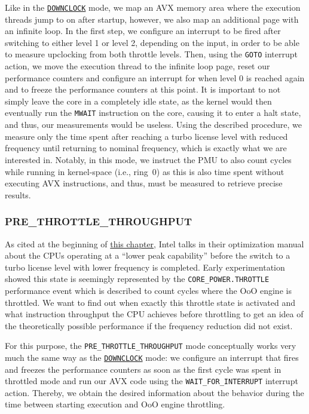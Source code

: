 Like in the \hyperref[sec:analysis:design:measurementmodes:downclock]{\texttt{DOWNCLOCK}} mode, we map an \gls{AVX} memory area where the execution threads jump to on after startup, however, we also map an additional page with an infinite loop. In the first step, we configure an interrupt to be fired after switching to either level 1 or level 2, depending on the input, in order to be able to measure upclocking from both throttle levels. Then, using the \texttt{GOTO} interrupt action, we move the execution thread to the infinite loop page, reset our performance counters and configure an interrupt for when level 0 is reached again and to freeze the performance counters at this point. It is important to not simply leave the core in a completely idle state, as the kernel would then eventually run the \texttt{MWAIT} \cite{intelsdminstructionreference} instruction on the core, causing it to enter a halt state, and thus, our measurements would be useless. Using the described procedure, we measure only the time spent after reaching a turbo license level with reduced frequency until returning to nominal frequency, which is exactly what we are interested in. Notably, in this mode, we instruct the \gls{PMU} to also count cycles while running in kernel-space (i.e., ring~$0$) as this is also time spent without executing \gls{AVX} instructions, and thus, must be measured to retrieve precise results.

\subsubsection{PRE\_THROTTLE\_THROUGHPUT}
\label{sec:analysis:design:measurementmodes:prethrottlethroughput}

As cited at the beginning of \hyperref[sec:analysis]{this chapter}, Intel talks in their optimization manual \cite{inteloptimizationmanual} about the \glspl{CPU} operating at a \enquote{lower peak capability} before the switch to a turbo license level with lower frequency is completed. Early experimentation showed this state is seemingly represented by the \texttt{CORE\_POWER.THROTTLE} performance event which is described \cite{intelsdmsysprogguide} to count cycles where the \gls{OoO} engine is throttled. We want to find out when exactly this throttle state is activated and what instruction throughput the \gls{CPU} achieves before throttling to get an idea of the theoretically possible performance if the frequency reduction did not exist.

For this purpose, the \texttt{PRE\_THROTTLE\_THROUGHPUT} mode conceptually works very much the same way as the \hyperref[sec:analysis:design:measurementmodes:downclock]{\texttt{DOWNCLOCK}} mode: we configure an interrupt that fires and freezes the performance counters as soon as the first cycle was spent in throttled mode and run our \gls{AVX} code using the \texttt{WAIT\_FOR\_INTERRUPT} interrupt action. Thereby, we obtain the desired information about the behavior during the time between starting execution and \gls{OoO} engine throttling.

